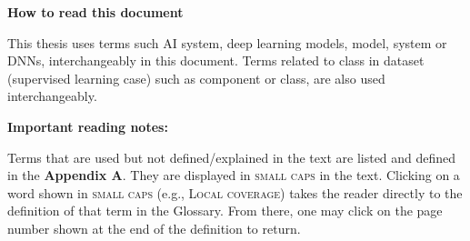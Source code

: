 
\begin{center}
{\fontsize{16}{15} \bf How to read this document}
\vspace{0.4cm}
\end{center}
\normalsize

This thesis uses terms such AI system, deep learning models, model, system or DNNs, interchangeably in this document. Terms related to class in dataset (supervised learning case) such as component or class, are also used interchangeably.

\textbf{Important reading notes:}

     Terms that are used but not defined/explained in the text are listed and defined in the \textbf{Appendix A}. They are displayed in \textsc{small caps} in the text. Clicking on a word shown in \textsc{small caps} (e.g., \textsc{Local coverage}) takes the reader directly to the definition of that term in the Glossary. From there, one may click on the page number shown at the end of the definition to return.



\clearpage

